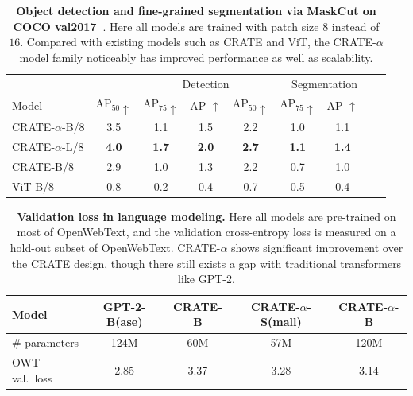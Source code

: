 \documentclass[../../book-main.tex]{subfiles}
\begin{document}
\begin{table}
    \centering
    \begin{tabular}{@{}lcccccccc@{}}
    \toprule
     &  & \multicolumn{3}{c}{Detection} &  \multicolumn{3}{c}{Segmentation} \\ 
    Model & AP$_{50} \uparrow $ & AP$_{75} \uparrow $ & AP $\uparrow$ & AP$_{50} \uparrow$ & AP$_{75} \uparrow $ & AP $\uparrow$ \\ 
    \midrule
    \midrule
    CRATE-\(\alpha\)-B/8 & 3.5 & 1.1 & 1.5 & 2.2 & 1.0 & 1.1 \\
    CRATE-\(\alpha\)-L/8 & \textbf{4.0} & \textbf{1.7} & \textbf{2.0} & \textbf{2.7} & \textbf{1.1} & \textbf{1.4} \\
    \midrule
    \color{gray}CRATE-B/8 & \color{gray}2.9 & \color{gray}1.0 & \color{gray}1.3 & \color{gray}2.2 & \color{gray}0.7 & \color{gray}1.0 \\
    \color{gray}ViT-B/8 & \color{gray}0.8 & \color{gray}0.2 & \color{gray}0.4 & \color{gray}0.7 & \color{gray}0.5 & \color{gray}0.4 \\
    \bottomrule
    \end{tabular}
    \caption{\small \textbf{Object detection and fine-grained segmentation via MaskCut on COCO val2017~\citep{lin2014microsoft}}. Here all models are trained with patch size \(8\) instead of \(16\). Compared with existing models such as CRATE and ViT, the CRATE-\(\alpha\) model family noticeably has improved performance as well as scalability.}
    \label{tab:crate_alpha_detection_segmentation}
\end{table}

\begin{table}
    \centering 
    \begin{tabular}{@{}lcccc@{}}
    \toprule
    Model & GPT-2-B(ase) & CRATE-B & CRATE-\(\alpha\)-S(mall) & CRATE-\(\alpha\)-B \\ 
    \midrule
    \midrule
    \# parameters & 124M & 60M & 57M & 120M \\
    OWT val.~loss & 2.85 & 3.37 & 3.28 & 3.14 \\
    \bottomrule
    \end{tabular}
    \caption{\small\textbf{Validation loss in language modeling.} Here all models are pre-trained on most of OpenWebText, and the validation cross-entropy loss is measured on a hold-out subset of OpenWebText. CRATE-\(\alpha\) shows significant improvement over the CRATE design, though there still exists a gap with traditional transformers like GPT-2.}
    \label{tab:crate_alpha_lm}
\end{table}
\end{document}
